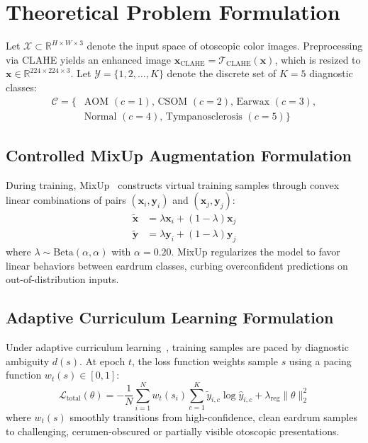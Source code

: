 \documentclass[12pt,a4paper]{report}
\begin{document}
\section{Theoretical Problem Formulation}
Let $\mathcal{X} \subset \mathbb{R}^{H \times W \times 3}$ denote the input space of otoscopic color images. Preprocessing via CLAHE yields an enhanced image $\mathbf{x}_{\text{CLAHE}} = \mathcal{T}_{\text{CLAHE}}(\mathbf{x})$, which is resized to $\mathbf{x} \in \mathbb{R}^{224 \times 224 \times 3}$. Let $\mathcal{Y} = \{1, 2, \dots, K\}$ denote the discrete set of $K=5$ diagnostic classes:
\begin{equation}
\begin{aligned}
    \mathcal{C} = \{&\text{AOM } (c=1), \, \text{CSOM } (c=2), \, \text{Earwax } (c=3), \\
    &\text{Normal } (c=4), \, \text{Tympanosclerosis } (c=5)\}
\end{aligned}
\end{equation}

\subsection{Controlled MixUp Augmentation Formulation}
During training, MixUp~\cite{ref_zhang2017_mixup} constructs virtual training samples through convex linear combinations of pairs $(\mathbf{x}_i, \mathbf{y}_i)$ and $(\mathbf{x}_j, \mathbf{y}_j)$:
\begin{align}
    \tilde{\mathbf{x}} &= \lambda \mathbf{x}_i + (1 - \lambda) \mathbf{x}_j \\
    \tilde{\mathbf{y}} &= \lambda \mathbf{y}_i + (1 - \lambda) \mathbf{y}_j
\end{align}
where $\lambda \sim \mathrm{Beta}(\alpha, \alpha)$ with $\alpha = 0.20$. MixUp regularizes the model to favor linear behaviors between eardrum classes, curbing overconfident predictions on out-of-distribution inputs.

\subsection{Adaptive Curriculum Learning Formulation}
Under adaptive curriculum learning~\cite{ref_bengio2009_curriculum}, training samples are paced by diagnostic ambiguity $d(s)$. At epoch $t$, the loss function weights sample $s$ using a pacing function $w_t(s) \in [0, 1]$:
\begin{equation}
    \mathcal{L}_{\text{total}}(\theta) = -\frac{1}{N} \sum_{i=1}^N w_t(s_i) \sum_{c=1}^K \tilde{y}_{i,c} \log \hat{y}_{i,c} + \lambda_{\text{reg}} \|\theta\|_2^2
\end{equation}
where $w_t(s)$ smoothly transitions from high-confidence, clean eardrum samples to challenging, cerumen-obscured or partially visible otoscopic presentations.
\end{document}
